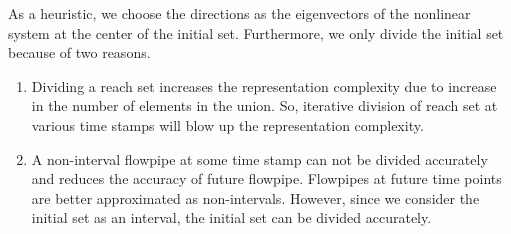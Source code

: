 As a heuristic, we choose the directions as the eigenvectors of the
nonlinear system at the center of the initial set.  Furthermore, we
only divide the initial set because of two reasons.
%
\begin{enumerate}
\item Dividing a reach set increases the representation complexity due to
increase in the number of elements in the union.  So, iterative
division of reach set at various time stamps will blow up the
representation complexity.
\item  A non-interval flowpipe at some time stamp can not
be divided accurately and reduces the accuracy of future flowpipe.
Flowpipes at future time points are better approximated as
non-intervals.  However, since we consider the initial set as an
interval, the initial set can be divided accurately.
\end{enumerate}
%
%
